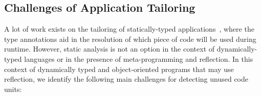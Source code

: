 \subsection{Challenges of Application Tailoring} \label{sec:challenges}

A lot of work exists on the tailoring of statically-typed applications~\cite{ShortCour10a,ShortRays02a,ShortTip03a,ShortPopa04a,ShortTeod01a}, where the type annotations aid in the resolution of which piece of code will be used during runtime. 
However, static analysis is not an option in the context of dynamically-typed languages or in the presence of meta-programming and reflection.
In this context of dynamically typed and object-oriented programs that may use reflection, we identify the following main challenges for detecting unused code units:

